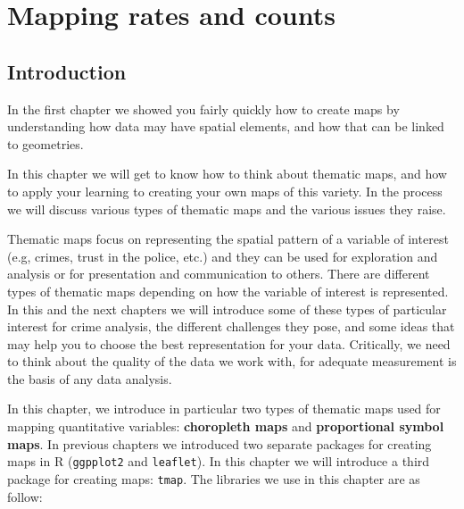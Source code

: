 \documentclass[
]{book}
\begin{document}
\hypertarget{mapping-rates-and-counts}{%
\chapter{Mapping rates and counts}\label{mapping-rates-and-counts}}

\hypertarget{introduction-2}{%
\section{Introduction}\label{introduction-2}}

In the first chapter we showed you fairly quickly how to create maps by understanding how data may have spatial elements, and how that can be linked to geometries.

In this chapter we will get to know how to think about thematic maps, and how to apply your learning to creating your own maps of this variety. In the process we will discuss various types of thematic maps and the various issues they raise.

Thematic maps focus on representing the spatial pattern of a variable of interest (e.g, crimes, trust in the police, etc.) and they can be used for exploration and analysis or for presentation and communication to others. There are different types of thematic maps depending on how the variable of interest is represented. In this and the next chapters we will introduce some of these types of particular interest for crime analysis, the different challenges they pose, and some ideas that may help you to choose the best representation for your data. Critically, we need to think about the quality of the data we work with, for adequate measurement is the basis of any data analysis.

In this chapter, we introduce in particular two types of thematic maps used for mapping quantitative variables: \textbf{choropleth maps} and \textbf{proportional symbol maps}. In previous chapters we introduced two separate packages for creating maps in R (\texttt{ggpplot2} and \texttt{leaflet}). In this chapter we will introduce a third package for creating maps: \texttt{tmap}. The libraries we use in this chapter are as follow:
\end{document}
